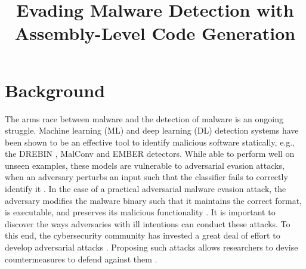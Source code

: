 \documentclass[conference]{IEEEtran}
\begin{document}
\title{Evading Malware Detection with Assembly-Level Code Generation}


\maketitle


\begin{abstract}

\end{abstract}

\IEEEpeerreviewmaketitle


\section{Background}
\label{sec:Background}


The arms race between malware and the detection of malware is an ongoing struggle. Machine learning (ML) and deep learning (DL) detection systems have been shown to be an effective tool to identify malicious software statically, e.g., the DREBIN \cite{arp2014drebin}, MalConv \cite{raff2018malware} and EMBER \cite{anderson2018ember} detectors. While able to perform well on unseen examples, these models are vulnerable to adversarial evasion attacks, when an adversary perturbs an input such that the classifier fails to correctly identify it \cite{szegedy2013intriguing}. In the case of a practical adversarial malware evasion attack, the adversary modifies the malware binary such that it maintains the correct format, is executable, and preserves its malicious functionality \cite{ling2021adversarial}. It is important to discover the ways adversaries with ill intentions can conduct these attacks. To this end, the cybersecurity community has invested a great deal of effort to develop adversarial attacks \cite{maiorca2019towards, park2020survey, li2021arms, ling2021adversarial}. Proposing such attacks allows researchers to devise countermeasures to defend against them \cite{li2021framework}.
\end{document}
